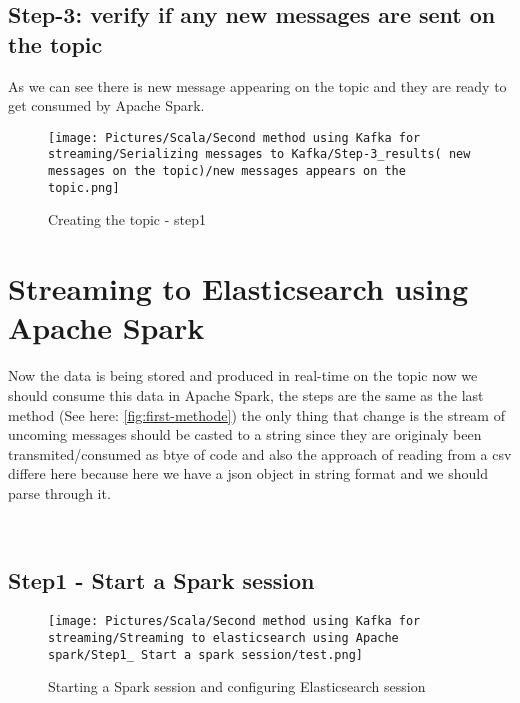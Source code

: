 \begin{spacing}{1.2}
\newpage
\subsection{Step-3: verify if any new messages are sent on the topic }
\par As we can see there is new message appearing on the topic and they are ready to get consumed by Apache Spark.
\begin{figure}[!htb] 
\begin{center} 
\texttt{[image: Pictures/Scala/Second method using Kafka for streaming/Serializing messages to Kafka/Step-3\_results( new messages on the topic)/new messages appears on the topic.png]}
\end{center} 
\label{fig:broker-Kafka-1}
\caption{Creating the topic - step1} 
\end{figure}  \FloatBarrier



\section{Streaming to Elasticsearch using Apache Spark }

\par Now the data is being stored and produced in real-time on the topic now we should consume this data in Apache Spark, the steps are the same as the last method (See here: \ref{fig:first-methode}) the only thing that change is the stream of uncoming messages should be casted to a string since they are originaly been transmited/consumed as btye of code and also the approach of reading from a csv differe here because here we have a json object in string format and we should parse through it.

\\

\subsection{Step1 - Start a Spark session }


\begin{figure}[!htb] 
\begin{center} 
\texttt{[image: Pictures/Scala/Second method using Kafka for streaming/Streaming to elasticsearch using Apache spark/Step1\_ Start a spark session/test.png]}
\end{center} 
\label{fig:broker-Kafka-1}
\caption{Starting a Spark session and configuring Elasticsearch session} 
\end{figure}  \FloatBarrier 


\end{spacing}
